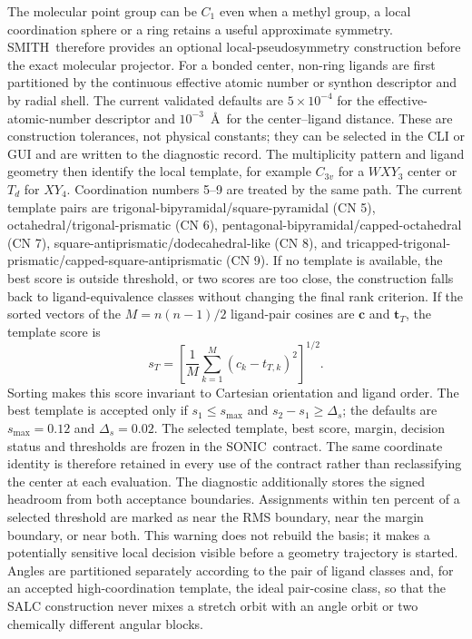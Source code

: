 \documentclass[journal=jctcce,manuscript=article,layout=traditional]{achemso}
\newcommand{\SONIC}{SONIC}
\newcommand{\SMITH}{\textsc{SMITH}}
\theoremstyle{definition}
\begin{document}
The molecular point group can be \(C_1\) even when a methyl group, a local
coordination sphere or a ring retains a useful approximate symmetry.  \SMITH\
therefore provides an optional local-pseudosymmetry construction before the
exact molecular projector.  For a bonded center, non-ring ligands are first
partitioned by the continuous effective atomic number or synthon descriptor
and by radial shell.  The current validated defaults are
\(5\times10^{-4}\) for the effective-atomic-number descriptor and
\(10^{-3}\)~\AA\ for the center--ligand distance.  These are construction
tolerances, not physical constants; they can be selected in the CLI or GUI and
are written to the diagnostic record.
The multiplicity pattern and ligand geometry then identify the local template,
for example \(C_{3v}\) for a \(WXY_3\) center or \(T_d\) for \(XY_4\).
Coordination numbers 5--9 are treated by the same path.  The current template
pairs are trigonal-bipyramidal/square-pyramidal (CN 5),
octahedral/trigonal-prismatic (CN 6), pentagonal-bipyramidal/capped-octahedral
(CN 7), square-antiprismatic/dodecahedral-like (CN 8), and
tricapped-trigonal-prismatic/capped-square-antiprismatic (CN 9).  If no
template is available, the best score is outside threshold, or two scores are
too close, the construction falls back to ligand-equivalence classes without
changing the final rank criterion.  If the sorted vectors of the
\(M=n(n-1)/2\) ligand-pair cosines are \(\mathbf c\) and
\(\mathbf t_T\), the template score is
\begin{equation}
 s_T=\left[\frac{1}{M}\sum_{k=1}^{M}(c_k-t_{T,k})^2\right]^{1/2}.
 \label{eq:local-template-score}
\end{equation}
Sorting makes this score invariant to Cartesian orientation and ligand order.
The best template is accepted only if \(s_1\le s_{\max}\) and
\(s_2-s_1\ge\Delta_s\); the defaults are \(s_{\max}=0.12\) and
\(\Delta_s=0.02\).  The selected template, best score, margin, decision status
and thresholds are frozen in the \SONIC\ contract.  The same coordinate
identity is therefore retained in every use of the contract rather than
reclassifying the center at each evaluation.
The diagnostic additionally stores the signed headroom from both acceptance
boundaries.  Assignments within ten percent of a selected threshold are marked
as near the RMS boundary, near the margin boundary, or near both.  This warning
does not rebuild the basis; it makes a potentially sensitive local decision
visible before a geometry trajectory is started.
Angles are partitioned separately according to the pair of ligand classes and,
for an accepted high-coordination template, the ideal pair-cosine class, so
that the SALC construction never mixes a stretch orbit with an angle orbit or
two chemically different angular blocks.
\end{document}
